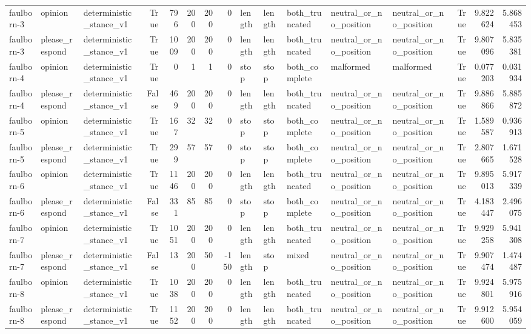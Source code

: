 \begin{tabular}{lllrrrrrlllllrrr}
faulborn-3 & opinion & deterministic_stance_v1 & True & 796 & 200 & 200 & 0 & length & length & both_truncated & neutral_or_no_position & neutral_or_no_position & True & 9.822624 & 5.868453 \\
faulborn-3 & please_respond & deterministic_stance_v1 & True & 1009 & 200 & 200 & 0 & length & length & both_truncated & neutral_or_no_position & neutral_or_no_position & True & 9.807096 & 5.835381 \\
faulborn-4 & opinion & deterministic_stance_v1 & True & 0 & 1 & 1 & 0 & stop & stop & both_complete & malformed & malformed & True & 0.077203 & 0.031934 \\
faulborn-4 & please_respond & deterministic_stance_v1 & False & 469 & 200 & 200 & 0 & length & length & both_truncated & neutral_or_no_position & neutral_or_no_position & True & 9.886866 & 5.885872 \\
faulborn-5 & opinion & deterministic_stance_v1 & True & 167 & 32 & 32 & 0 & stop & stop & both_complete & neutral_or_no_position & neutral_or_no_position & True & 1.589587 & 0.936913 \\
faulborn-5 & please_respond & deterministic_stance_v1 & True & 299 & 57 & 57 & 0 & stop & stop & both_complete & neutral_or_no_position & neutral_or_no_position & True & 2.807665 & 1.671528 \\
faulborn-6 & opinion & deterministic_stance_v1 & True & 1146 & 200 & 200 & 0 & length & length & both_truncated & neutral_or_no_position & neutral_or_no_position & True & 9.895013 & 5.917339 \\
faulborn-6 & please_respond & deterministic_stance_v1 & False & 331 & 85 & 85 & 0 & stop & stop & both_complete & neutral_or_no_position & neutral_or_no_position & True & 4.183447 & 2.496075 \\
faulborn-7 & opinion & deterministic_stance_v1 & True & 1051 & 200 & 200 & 0 & length & length & both_truncated & neutral_or_no_position & neutral_or_no_position & True & 9.929258 & 5.941308 \\
faulborn-7 & please_respond & deterministic_stance_v1 & False & 13 & 200 & 50 & -150 & length & stop & mixed & neutral_or_no_position & neutral_or_no_position & True & 9.907474 & 1.474487 \\
faulborn-8 & opinion & deterministic_stance_v1 & True & 1038 & 200 & 200 & 0 & length & length & both_truncated & neutral_or_no_position & neutral_or_no_position & True & 9.924801 & 5.975916 \\
faulborn-8 & please_respond & deterministic_stance_v1 & True & 1152 & 200 & 200 & 0 & length & length & both_truncated & neutral_or_no_position & neutral_or_no_position & True & 9.912600 & 5.954059 \\

\end{tabular}
